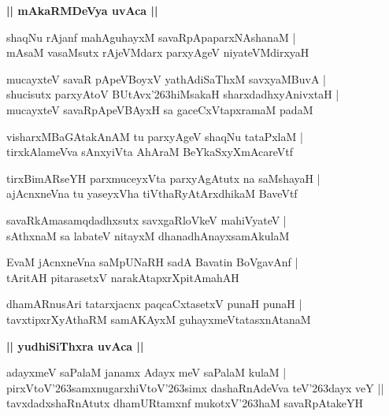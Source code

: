 \documentclass[twoside,12pt,openright]{book}
\def\S{\char'263}
\newcounter{shloka}[chapter]
\def\uvaca#1{\centerline{{\large\textbf{#1}}}}
\begin{document}
\uvaca{|| mAkaRMDeVya uvAca ||}

\begin{shloka}
shaqNu rAjanf mahAguhayxM savaRpApaparxNAshanaM |\\
mAsaM vasaMsutx rAjeVMdarx parxyAgeV niyateVMdirxyaH 
\end{shloka}

\begin{shloka}
mucayxteV savaR pApeVBoyxV yathAdiSaThxM savxyaMBuvA |\\
shucisutx parxyAtoV BUtAvx\S hiMsakaH sharxdadhxyAnivxtaH |\\
mucayxteV savaRpApeVBAyxH  sa gaceCxVtapxramaM padaM 
\end{shloka}

\begin{shloka}
visharxMBaGAtakAnAM tu parxyAgeV shaqNu tataPxlaM |\\
tirxkAlameVva sAnxyiVta AhAraM BeYkaSxyXmAcareVtf 
\end{shloka}

\begin{shloka}
tirxBimARseYH parxmuceyxVta parxyAgAtutx na saMshayaH |\\
ajAcnxneVna tu yaseyxVha tiVthaRyAtArxdhikaM BaveVtf 
\end{shloka}

\begin{shloka}
savaRkAmasamqdadhxsutx savxgaRloVkeV mahiVyateV |\\
sAthxnaM sa labateV nitayxM dhanadhAnayxsamAkulaM 
\end{shloka}

\begin{shloka}
EvaM jAcnxneVna saMpUNaRH sadA Bavatin BoVgavAnf |\\
tAritAH pitarasetxV narakAtapxrXpitAmahAH 
\end{shloka}

\begin{shloka}
dhamARnusAri tatarxjacnx paqcaCxtasetxV punaH punaH |\\
tavxtipxrXyAthaRM  samAKAyxM guhayxmeVtatasxnAtanaM 
\end{shloka}

\uvaca{|| yudhiSiThxra uvAca ||}

\begin{shloka}
adayxmeV saPalaM janamx Adayx meV saPalaM kulaM |\\
pirxVtoV\S samxnugarxhiVtoV\S simx dashaRnAdeVva teV\S dayx veY ||\\
tavxdadxshaRnAtutx dhamURtamxnf mukotxV\S haM savaRpAtakeYH 
\end{shloka}
\end{document}
